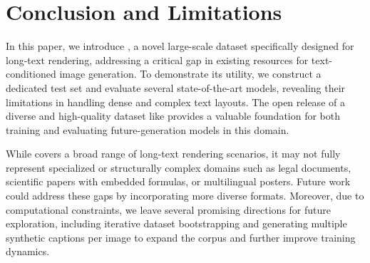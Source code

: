 \section{Conclusion and Limitations}

In this paper, we introduce \DatasetName, a novel large-scale dataset specifically designed for long-text rendering, addressing a critical gap in existing resources for text-conditioned image generation. 
To demonstrate its utility, we construct a dedicated test set and evaluate several state-of-the-art models, revealing their limitations in handling dense and complex text layouts. The open release of a diverse and high-quality dataset like \DatasetName provides a valuable foundation for both training and evaluating future-generation models in this domain.

While \DatasetName covers a broad range of long-text rendering scenarios, it may not fully represent specialized or structurally complex domains such as legal documents, scientific papers with embedded formulas, or multilingual posters. Future work could address these gaps by incorporating more diverse formats. Moreover, due to computational constraints, we leave several promising directions for future exploration, including iterative dataset bootstrapping and generating multiple synthetic captions per image to expand the corpus and further improve training dynamics.
